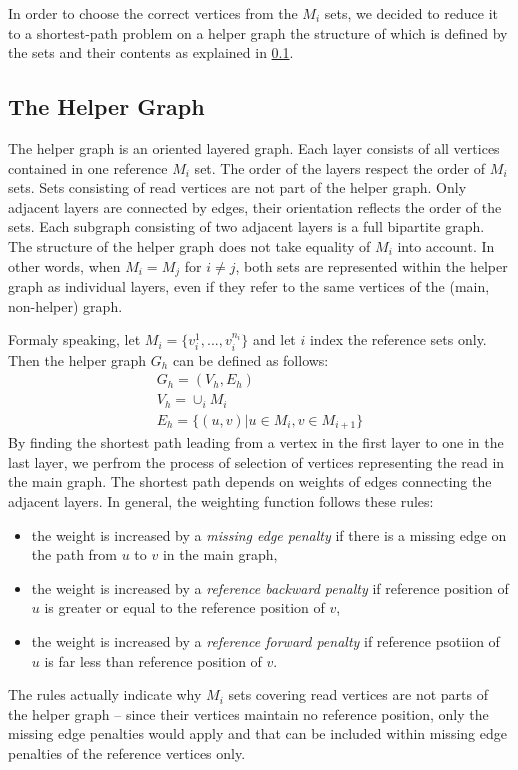 In order to choose the correct vertices from the $M_i$ sets, we decided to reduce it to a shortest-path problem on a helper graph the structure of which is defined by the sets and their contents as explained in \ref{subsec:helper-graph}.

\subsection{The Helper Graph}
\label{subsec:helper-graph}

The helper graph is an oriented layered graph. Each layer consists of all vertices contained in one reference $M_i$ set. The order of the layers respect the order of $M_i$ sets. Sets consisting of read vertices are not part of the helper graph. Only adjacent layers are connected by edges, their orientation reflects the order of the sets. Each subgraph consisting of two adjacent layers is a full bipartite graph. The structure of the helper graph does not take equality of $M_i$ into account. In other words, when $M_i = M_j$ for $i \ne j$, both sets are represented within the helper graph as individual layers, even if they refer to the same vertices of the (main, non-helper) graph.

Formaly speaking, let $M_i = \{v_{i}^{1}, ..., v_{i}^{n_i}\}$ and let $i$ index the reference sets only. Then the helper graph $G_h$ can be defined as follows:
\begin{align*}
G_h = (V_h, E_h) \\
V_h = \cup_i M_i \\
E_h = \{(u, v) | u \in M_i, v \in M_{i + 1}\}
\end{align*}
By finding the shortest path leading from a vertex in the first layer to one in the last layer, we perfrom the process of selection of vertices representing the read in the main graph. The shortest path depends on weights of edges connecting the adjacent layers. In general, the weighting function follows these rules:
\begin{itemize}
\item the weight is increased by a \textit{missing edge penalty} if there is a missing edge on the path from $u$ to $v$ in the main graph,
\item the weight is increased by a \textit{reference backward penalty} if reference position of $u$ is greater or equal to the reference position of $v$,
\item the weight is increased by a \textit{reference forward penalty} if reference psotiion of $u$ is far less than reference position of $v$.
\end{itemize}
The rules actually indicate why $M_i$ sets covering read vertices are not parts of the helper graph – since their vertices maintain no reference position, only the missing edge penalties would apply and that can be included within missing edge penalties of the reference vertices only.

